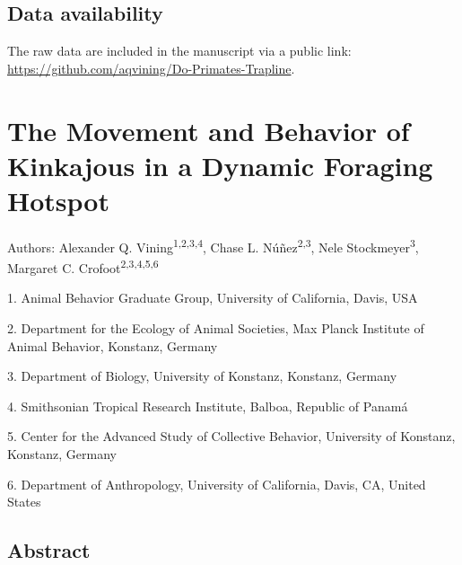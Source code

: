 \documentclass[twoside,12pt,final]{ucthesis-CA2012}
\begin{document}
\begin{ucmainmatter}
\hypertarget{data-availability}{%
\section{Data availability}\label{data-availability}}

The raw data are included in the manuscript via a public link: \url{https://github.com/aqvining/Do-Primates-Trapline}.

\hypertarget{math-sci}{%
\chapter{The Movement and Behavior of Kinkajous in a Dynamic Foraging Hotspot}\label{math-sci}}


Authors: Alexander Q. Vining\textsuperscript{1,2,3,4}, Chase L. Núñez\textsuperscript{2,3}, Nele Stockmeyer\textsuperscript{3}, Margaret C. Crofoot\textsuperscript{2,3,4,5,6}

\par
\begin{scriptsize}
1.  Animal Behavior Graduate Group, University of California, Davis, USA

2.  Department for the Ecology of Animal Societies, Max Planck Institute of Animal Behavior, Konstanz, Germany

3.  Department of Biology, University of Konstanz, Konstanz, Germany

4.  Smithsonian Tropical Research Institute, Balboa, Republic of Panamá

5.  Center for the Advanced Study of Collective Behavior, University of Konstanz, Konstanz, Germany

6.  Department of Anthropology, University of California, Davis, CA, United States
\par
\end{scriptsize}
\hypertarget{abstract-1}{%
\section{Abstract}\label{abstract-1}}


\end{ucmainmatter}
\end{document}
